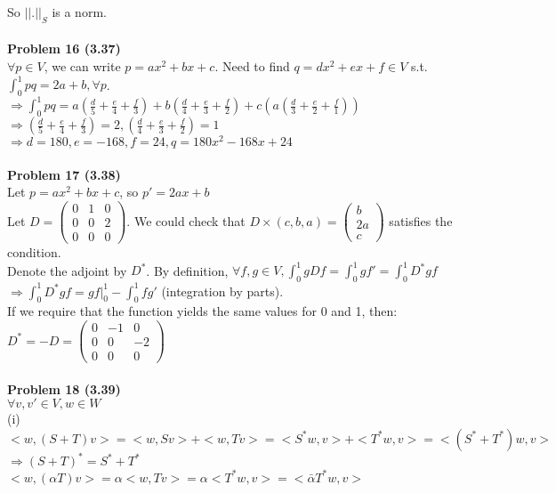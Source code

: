\documentclass[letterpaper,12pt]{article}
\theoremstyle{definition}
\begin{document}
So $||.||_S$ is a norm.\\ 
\\
\noindent\textbf{Problem 16 (3.37)}\\
$\forall p\in V$, we can write $p = ax^2+bx+c$. Need to find $q = dx^2+ex+f\in V$ s.t. $\int_0^1 pq = 2a+b, \forall p$.\\
$\Rightarrow \int_0^1pq = a(\frac{d}{5}+\frac{e}{4}+\frac{f}{3})+b(\frac{d}{4}+\frac{e}{3}+\frac{f}{2})+c(a(\frac{d}{3}+\frac{e}{2}+\frac{f}{1}))$\\
$\Rightarrow (\frac{d}{5}+\frac{e}{4}+\frac{f}{3}) = 2, (\frac{d}{4}+\frac{e}{3}+\frac{f}{2}) = 1$\\
$\Rightarrow d = 180, e = -168, f =24, q=180x^2-168x+24$\\
\\
\noindent\textbf{Problem 17 (3.38)}\\
Let $p = ax^2+bx+c$, so $p' = 2ax+b$\\
Let $D = \begin{pmatrix}
0&1&0\\
0&0&2\\
0&0&0
\end{pmatrix}$. We could check that $D\times (c, b, a) = \begin{pmatrix}
b\\2a\\c
\end{pmatrix}$ satisfies the condition.\\
Denote the adjoint by $D^*$. By definition, $\forall f, g\in V,\int_0^1 gDf = \int_0^1gf'=\int_0^1 D^*gf$\\
$\Rightarrow \int_0^1 D^*gf = gf|_0^1 - \int_0^1 fg'$ (integration by parts).\\
If we require that the function yields the same values for 0 and 1, then:\\
$D^* = -D = \begin{pmatrix}
0&-1&0\\
0&0&-2\\
0&0&0
\end{pmatrix}$\\
\\
\noindent\textbf{Problem 18 (3.39)}\\
$\forall v, v'\in V, w\in W$\\
(i)\\
$<w, (S+T)v> = <w, Sv> + <w, Tv> = <S^*w, v>+<T^*w, v>= <(S^*+T^*)w, v>$\\
$\Rightarrow (S+T)^* = S^* + T^*$\\
$<w, (\alpha T)v> = \alpha<w, Tv> = \alpha<T^*w, v> = <\bar{\alpha}T^*w, v>$\\
\end{document}
